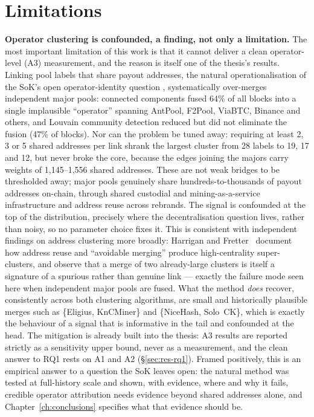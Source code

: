 \documentclass[logo,msc]{infthesis}           %
\begin{document}
\section{Limitations}
\label{sec:disc-limitations}

\textbf{Operator clustering is confounded, a finding, not only a
limitation.} The most important limitation of this work is that it cannot
deliver a clean operator-level (A3) measurement, and the reason is itself one
of the thesis's results. Linking pool labels that share payout addresses,
the natural operationalisation of the SoK's open operator-identity question
\cite{ovezik2025sok}, systematically over-merges independent major pools:
connected components fused 64\% of all blocks into a single implausible
``operator'' spanning AntPool, F2Pool, ViaBTC, Binance and others, and Louvain
community detection \cite{blondel2008louvain} reduced but did not eliminate the
fusion (47\% of blocks). Nor can the problem be tuned away: requiring at least
2, 3 or 5 shared addresses per link shrank the largest cluster from 28 labels
to 19, 17 and 12, but never broke the core, because the edges joining the
majors carry weights of 1{,}145--1{,}556 shared addresses. These are not weak
bridges to be thresholded away; major pools genuinely share
hundreds-to-thousands of payout addresses on-chain, through shared custodial
and mining-as-a-service infrastructure and address reuse across rebrands. The
signal is confounded at the top of the distribution, precisely where the
decentralisation question lives, rather than noisy, so no parameter choice
fixes it. This is consistent with independent findings on address clustering
more broadly: Harrigan and Fretter~\cite{harrigan2016unreasonable} document how
address reuse and ``avoidable merging'' produce high-centrality super-clusters,
and observe that a merge of two already-large clusters is itself a signature of
a spurious rather than genuine link --- exactly the failure mode seen here when
independent major pools are fused. What the method \emph{does} recover, consistently across both
clustering algorithms, are small and historically plausible merges such as
\{Eligius, KnCMiner\} and \{NiceHash, Solo~CK\}, which is exactly the
behaviour of a signal that is informative in the tail and confounded at the
head. The mitigation is already built into the thesis: A3 results are reported
strictly as a sensitivity upper bound, never as a measurement, and the clean
answer to RQ1 rests on A1 and A2 (\S\ref{sec:res-rq1}). Framed positively,
this is an empirical answer to a question the SoK leaves open: the natural
method was tested at full-history scale and shown, with evidence, where and
why it fails, credible operator attribution needs evidence beyond shared
addresses alone, and Chapter~\ref{ch:conclusions} specifies what that evidence
should be.
\end{document}
